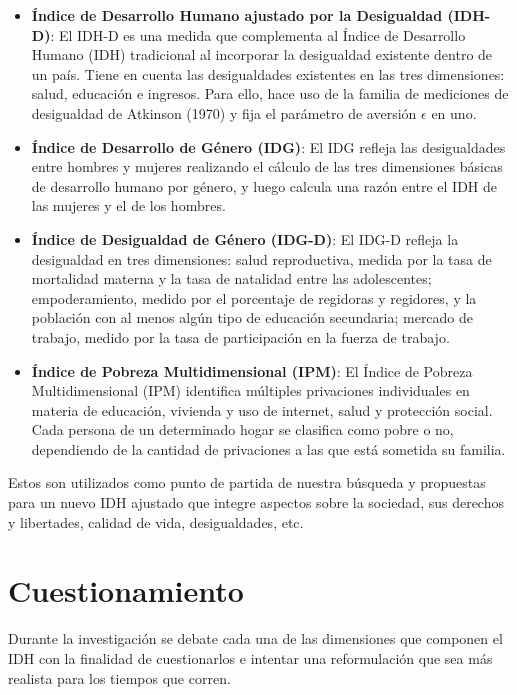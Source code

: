 \documentclass[
  10pt,
]{article}
\begin{document}
\begin{itemize}
\item
  \textbf{Índice de Desarrollo Humano ajustado por la Desigualdad
  (IDH-D)}: El IDH-D es una medida que complementa al Índice de
  Desarrollo Humano (IDH) tradicional al incorporar la desigualdad
  existente dentro de un país. Tiene en cuenta las desigualdades
  existentes en las tres dimensiones: salud, educación e ingresos. Para
  ello, hace uso de la familia de mediciones de desigualdad de Atkinson
  (1970) y fija el parámetro de aversión \(\epsilon\) en uno.
\item
  \textbf{Índice de Desarrollo de Género (IDG)}: El IDG refleja las
  desigualdades entre hombres y mujeres realizando el cálculo de las
  tres dimensiones básicas de desarrollo humano por género, y luego
  calcula una razón entre el IDH de las mujeres y el de los hombres.
\item
  \textbf{Índice de Desigualdad de Género (IDG-D)}: El IDG-D refleja la
  desigualdad en tres dimensiones: salud reproductiva, medida por la
  tasa de mortalidad materna y la tasa de natalidad entre las
  adolescentes; empoderamiento, medido por el porcentaje de regidoras y
  regidores, y la población con al menos algún tipo de educación
  secundaria; mercado de trabajo, medido por la tasa de participación en
  la fuerza de trabajo.
\item
  \textbf{Índice de Pobreza Multidimensional (IPM)}: El Índice de
  Pobreza Multidimensional (IPM) identifica múltiples privaciones
  individuales en materia de educación, vivienda y uso de internet,
  salud y protección social. Cada persona de un determinado hogar se
  clasifica como pobre o no, dependiendo de la cantidad de privaciones a
  las que está sometida su familia.
\end{itemize}

Estos son utilizados como punto de partida de nuestra búsqueda y
propuestas para un nuevo IDH ajustado que integre aspectos sobre la
sociedad, sus derechos y libertades, calidad de vida, desigualdades,
etc.

\pagebreak

\section{Cuestionamiento}\label{cuestionamiento}

Durante la investigación se debate cada una de las dimensiones que
componen el IDH con la finalidad de cuestionarlos e intentar una
reformulación que sea más realista para los tiempos que corren.
\end{document}
